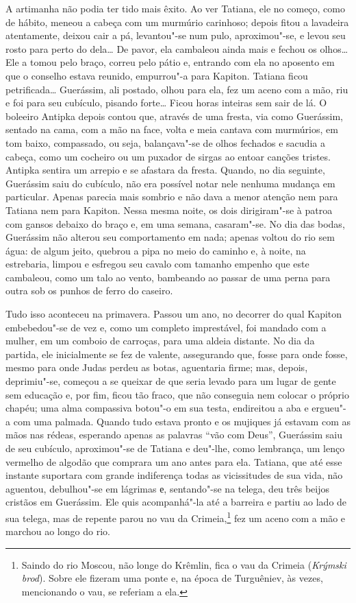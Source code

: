 A artimanha não podia ter tido mais êxito. Ao ver Tatiana, ele no
começo, como de hábito, meneou a cabeça com um murmúrio carinhoso;
depois fitou a lavadeira atentamente, deixou cair a pá, levantou"-se num
pulo, aproximou"-se, e levou seu rosto para perto do dela\ldots{} De pavor,
ela cambaleou ainda mais e fechou os olhos\ldots{} Ele a tomou pelo braço,
correu pelo pátio e, entrando com ela no aposento em que o conselho
estava reunido, empurrou"-a para Kapiton. Tatiana ficou petrificada\ldots{}
Guerássim, ali postado, olhou para ela, fez um aceno com a mão, riu e
foi para seu cubículo, pisando forte\ldots{} Ficou horas inteiras sem sair de
lá. O boleeiro Antipka depois contou que, através de uma fresta, via
como Guerássim, sentado na cama, com a mão na face, volta e meia cantava
com murmúrios, em tom baixo, compassado, ou seja, balançava"-se de olhos
fechados e sacudia a cabeça, como um cocheiro ou um puxador de sirgas ao
entoar canções tristes. Antipka sentira um arrepio e se afastara da
fresta. Quando, no dia seguinte, Guerássim saiu do cubículo, não era
possível notar nele nenhuma mudança em particular. Apenas parecia mais
sombrio e não dava a menor atenção nem para Tatiana nem para Kapiton.
Nessa mesma noite, os dois dirigiram"-se à patroa com gansos debaixo do
braço e, em uma semana, casaram"-se. No dia das bodas, Guerássim não
alterou seu comportamento em nada; apenas voltou do rio sem água: de
algum jeito, quebrou a pipa no meio do caminho e, à noite, na
estrebaria, limpou e esfregou seu cavalo com tamanho empenho que este
cambaleou, como um talo ao vento, bambeando ao passar de uma perna para
outra sob os punhos de ferro do caseiro.

Tudo isso aconteceu na primavera. Passou um ano, no decorrer do qual
Kapiton embebedou"-se de vez e, como um completo imprestável, foi mandado
com a mulher, em um comboio de carroças, para uma aldeia distante. No
dia da partida, ele inicialmente se fez de valente, assegurando que,
fosse para onde fosse, mesmo para onde Judas perdeu as botas, aguentaria
firme; mas, depois, deprimiu"-se, começou a se queixar de que seria
levado para um lugar de gente sem educação e, por fim, ficou tão fraco,
que não conseguia nem colocar o próprio chapéu; uma alma compassiva
botou"-o em sua testa, endireitou a aba e ergueu"-a com uma palmada.
Quando tudo estava pronto e os mujiques já estavam com as mãos nas
rédeas, esperando apenas as palavras ``vão com Deus'', Guerássim saiu de
seu cubículo, aproximou"-se de Tatiana e deu"-lhe, como lembrança, um
lenço vermelho de algodão que comprara um ano antes para ela. Tatiana,
que até esse instante suportara com grande indiferença todas as
vicissitudes de sua vida, não aguentou, debulhou"-se em lágrimas е,
sentando"-se na telega, deu três beijos cristãos em Guerássim. Ele quis
acompanhá"-la até a barreira e partiu ao lado de sua telega, mas de
repente parou no vau da Crimeia,\footnote{Saindo do rio Moscou, não
  longe do Krêmlin, fica o vau da Crimeia (\emph{Krýmski brod}). Sobre
  ele fizeram uma ponte e, na época de Turguêniev, às vezes, mencionando
  o vau, se referiam a ela.} fez um aceno com a mão e marchou ao longo
do rio.

